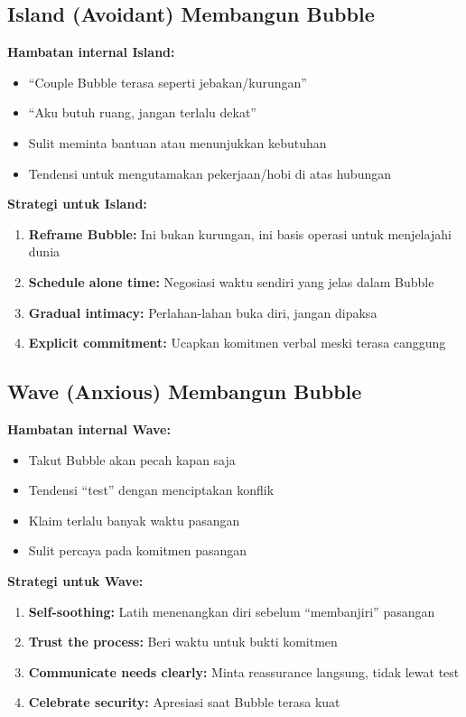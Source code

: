 \subsection{Island (Avoidant) Membangun Bubble}

\begin{warningbox}
\textbf{Hambatan internal Island:}
\begin{itemize}
    \item ``Couple Bubble terasa seperti jebakan/kurungan''
    \item ``Aku butuh ruang, jangan terlalu dekat''
    \item Sulit meminta bantuan atau menunjukkan kebutuhan
    \item Tendensi untuk mengutamakan pekerjaan/hobi di atas hubungan
\end{itemize}

\textbf{Strategi untuk Island:}
\begin{enumerate}
    \item \textbf{Reframe Bubble:} Ini bukan kurungan, ini basis operasi untuk menjelajahi dunia
    \item \textbf{Schedule alone time:} Negosiasi waktu sendiri yang jelas dalam Bubble
    \item \textbf{Gradual intimacy:} Perlahan-lahan buka diri, jangan dipaksa
    \item \textbf{Explicit commitment:} Ucapkan komitmen verbal meski terasa canggung
\end{enumerate}
\end{warningbox}

\subsection{Wave (Anxious) Membangun Bubble}

\begin{warningbox}
\textbf{Hambatan internal Wave:}
\begin{itemize}
    \item Takut Bubble akan pecah kapan saja
    \item Tendensi ``test'' dengan menciptakan konflik
    \item Klaim terlalu banyak waktu pasangan
    \item Sulit percaya pada komitmen pasangan
\end{itemize}

\textbf{Strategi untuk Wave:}
\begin{enumerate}
    \item \textbf{Self-soothing:} Latih menenangkan diri sebelum ``membanjiri'' pasangan
    \item \textbf{Trust the process:} Beri waktu untuk bukti komitmen
    \item \textbf{Communicate needs clearly:} Minta reassurance langsung, tidak lewat test
    \item \textbf{Celebrate security:} Apresiasi saat Bubble terasa kuat
\end{enumerate}
\end{warningbox}

